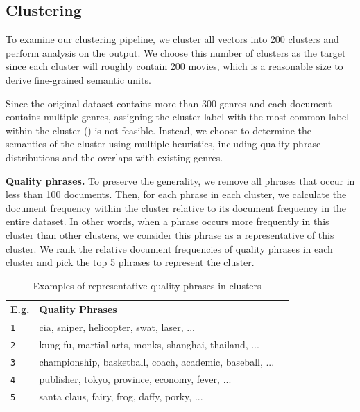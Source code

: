 \documentclass{article}
\begin{document}
\begin{multicols}{2}

\subsection{Clustering}

To examine our clustering pipeline, we cluster all vectors into 200 clusters and perform analysis on the output. We choose this number of clusters as the target since each cluster will roughly contain 200 movies, which is a reasonable size to derive fine-grained semantic units.

Since the original dataset contains more than 300 genres and each document contains multiple genres, assigning the cluster label with the most common label within the cluster (\cite{aharoni-goldberg-2020-unsupervised}) is not feasible. Instead, we choose to determine the semantics of the cluster using multiple heuristics, including quality phrase distributions and the overlaps with existing genres.

\textbf{Quality phrases.} To preserve the generality, we remove all phrases that occur in less than 100 documents. Then, for each phrase in each cluster, we calculate the document frequency within the cluster relative to its document frequency in the entire dataset. In other words, when a phrase occurs more frequently in this cluster than other clusters, we consider this phrase as a representative of this cluster. We rank the relative document frequencies of quality phrases in each cluster and pick the top 5 phrases to represent the cluster. 

\begin{table}
\caption{Examples of representative quality phrases in clusters}
\centering
\begin{tabularx}{.8\textwidth}{llX}
    \textbf{E.g.} & \textbf{Quality Phrases} \\
    \hline
    \texttt 1 & cia, sniper, helicopter, swat, laser, ...\\
    \texttt 2 & kung fu, martial arts, monks, shanghai, thailand, ...\\
    \texttt 3 & championship, basketball, coach, academic, baseball, ...\\
    \texttt 4 & publisher, tokyo, province, economy, fever, ...\\
    \texttt 5 & santa claus, fairy, frog, daffy, porky, ...\\
\end{tabularx}
\label{table:cluster_rep_quality_phrases}
\end{table}


\end{multicols}
\end{document}
